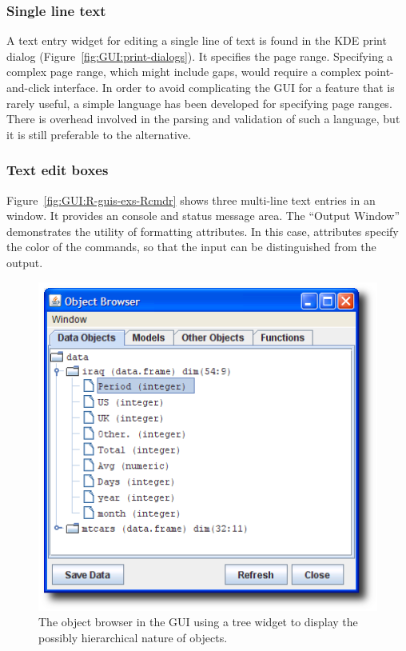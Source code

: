 \subsubsection{Single line text}
\label{sec:GUI:single-line-text}

A text entry widget for editing a single line of text is found in the
KDE print dialog (Figure~\ref{fig:GUI:print-dialogs}). It specifies
the page range. Specifying a complex page range, which might include
gaps, would require a complex point-and-click interface. In
order to avoid complicating the GUI for a feature that is rarely
useful, a simple language has been developed for specifying page
ranges. There is overhead involved in the parsing and validation of
such a language, but it is still preferable to the alternative.

\subsubsection{Text edit boxes}
\label{sec:GUI:textboxes}

Figure~\ref{fig:GUI:R-guis-exs-Rcmdr} shows three multi-line text
entries in an  window. It provides an \R\/ console and
status message area. The ``Output Window'' demonstrates the utility of
formatting attributes. In this case, attributes specify the color of
the commands, so that the input can be distinguished from the output.



\begin{figure}
  \centering
  \includegraphics[width=.6\textwidth]{JGR-object-browser}
 \caption{
   The object browser in the  GUI
   using a tree widget 
   to display the possibly hierarchical nature of \R\/ objects.
   }
 \label{fig:GUI:R-guis-exs-JGR}
\end{figure}


